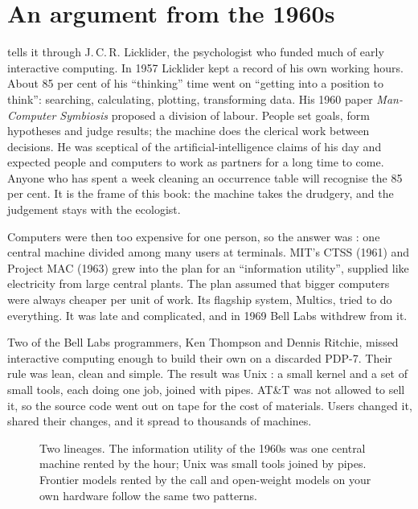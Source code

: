 \section{An argument from the 1960s}

\textcite{waldrop2002dreammachine} tells it through J.\,C.\,R. Licklider, the
psychologist who funded much of early interactive computing. In 1957 Licklider
kept a record of his own working hours. About 85 per cent of his ``thinking''
time went on ``getting into a position to think'': searching, calculating, plotting,
transforming data. His 1960 paper \emph{Man-Computer Symbiosis} proposed a
division of labour. People set goals, form hypotheses and judge results; the
machine does the clerical work between decisions. He was sceptical of the
artificial-intelligence claims of his day and expected people and computers to
work as partners for a long time to come. Anyone who has spent a week cleaning
an occurrence table will recognise the 85 per cent. It is the frame of this
book: the machine takes the drudgery, and the judgement stays with the
ecologist.

Computers were then too expensive for one person, so the answer was
: one central machine divided among many users at terminals.
MIT's CTSS (1961) and Project MAC (1963) grew into the plan for an
``information utility'', supplied like electricity from large central plants.
The plan assumed that bigger computers were always cheaper per unit of work. Its
flagship system, Multics, tried to do everything. It was late and complicated,
and in 1969 Bell Labs withdrew from it.

Two of the Bell Labs programmers, Ken Thompson and Dennis Ritchie, missed
interactive computing enough to build their own on a discarded PDP-7. Their rule
was lean, clean and simple. The result was Unix \parencite{ritchie1974unix}: a
small kernel and a set of small tools, each doing one job, joined with pipes.
AT\&T was not allowed to sell it, so the source code went out on tape for the
cost of materials. Users changed it, shared their changes, and it spread to
thousands of machines.

\begin{figure}[htbp]
\centering
{}
\caption{Two lineages. The information utility of the 1960s was one central
machine rented by the hour; Unix was small tools joined by pipes. Frontier
models rented by the call and open-weight models on your own hardware follow
the same two patterns.}
\label{fig:lineages}
\end{figure}

